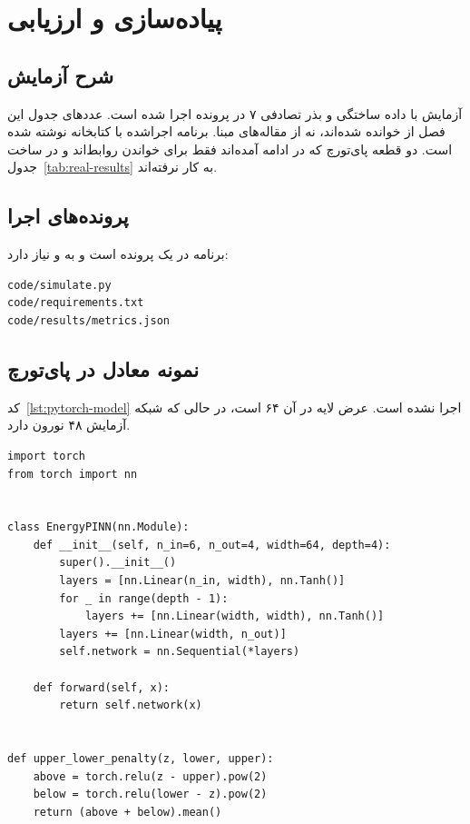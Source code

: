 \chapter{پیاده‌سازی و ارزیابی}
\label{chap:implementation}

\section{شرح آزمایش}
آزمایش با داده ساختگی و بذر تصادفی ۷ در پرونده  اجرا شده است. عددهای جدول این فصل از  خوانده شده‌اند، نه از مقاله‌های مبنا. برنامه اجراشده با کتابخانه  نوشته شده است. دو قطعه پای‌تورچ که در ادامه آمده‌اند فقط برای خواندن روابط‌اند و در ساخت جدول~\ref{tab:real-results} به کار نرفته‌اند.

\section{پرونده‌های اجرا}
برنامه در یک پرونده است و به  و  نیاز دارد:
\begin{latin}
\begin{verbatim}
code/simulate.py
code/requirements.txt
code/results/metrics.json
\end{verbatim}
\end{latin}

\section{نمونه معادل در پای‌تورچ}
کد~\ref{lst:pytorch-model} اجرا نشده است. عرض لایه در آن ۶۴ است، در حالی که شبکه آزمایش ۴۸ نورون دارد.

\begin{latin}
\begin{lstlisting}[caption={\protect\lr{Optional PyTorch sketch; not used for the reported table}},label={lst:pytorch-model}]
import torch
from torch import nn


class EnergyPINN(nn.Module):
    def __init__(self, n_in=6, n_out=4, width=64, depth=4):
        super().__init__()
        layers = [nn.Linear(n_in, width), nn.Tanh()]
        for _ in range(depth - 1):
            layers += [nn.Linear(width, width), nn.Tanh()]
        layers += [nn.Linear(width, n_out)]
        self.network = nn.Sequential(*layers)

    def forward(self, x):
        return self.network(x)


def upper_lower_penalty(z, lower, upper):
    above = torch.relu(z - upper).pow(2)
    below = torch.relu(lower - z).pow(2)
    return (above + below).mean()
\end{lstlisting}
\end{latin}

